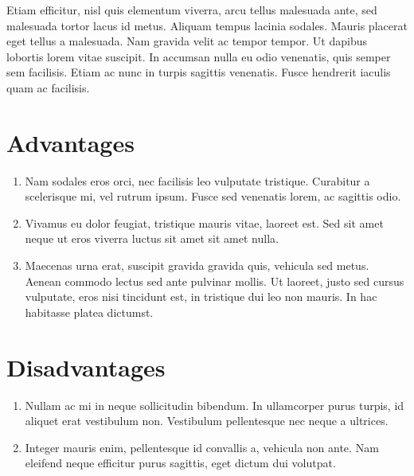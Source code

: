 \documentclass{paper}
\begin{document}
Etiam efficitur, nisl quis elementum viverra, arcu tellus malesuada ante, sed malesuada tortor lacus id metus. Aliquam tempus lacinia sodales. Mauris placerat eget tellus a malesuada. Nam gravida velit ac tempor tempor. Ut dapibus lobortis lorem vitae suscipit. In accumsan nulla eu odio venenatis, quis semper sem facilisis. Etiam ac nunc in turpis sagittis venenatis. Fusce hendrerit iaculis quam ac facilisis.

\section{Advantages}
\begin{enumerate}[\textbf{+}]
    \item Nam sodales eros orci, nec facilisis leo vulputate tristique. Curabitur a scelerisque mi, vel rutrum ipsum. Fusce sed venenatis lorem, ac sagittis odio.
    \item Vivamus eu dolor feugiat, tristique mauris vitae, laoreet est. Sed sit amet neque ut eros viverra luctus sit amet sit amet nulla. 
    \item Maecenas urna erat, suscipit gravida gravida quis, vehicula sed metus. Aenean commodo lectus sed ante pulvinar mollis. Ut laoreet, justo sed cursus vulputate, eros nisi tincidunt est, in tristique dui leo non mauris. In hac habitasse platea dictumst.
\end{enumerate}

\section{Disadvantages}
\begin{enumerate}[\textbf{--}]
    \item Nullam ac mi in neque sollicitudin bibendum. In ullamcorper purus turpis, id aliquet erat vestibulum non. Vestibulum pellentesque nec neque a ultrices. 
    \item Integer mauris enim, pellentesque id convallis a, vehicula non ante. Nam eleifend neque efficitur purus sagittis, eget dictum dui volutpat.
\end{enumerate}
\end{document}
